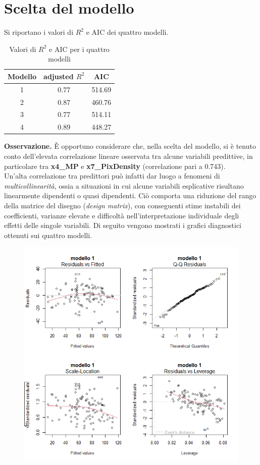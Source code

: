 \section{Scelta del modello}
Si riportano i valori di $R^2$ e AIC dei quattro modelli.
\begin{table}[H]
	\centering
	\begin{tabular}{|c|c|c|}
		\hline
		\textbf{Modello} & \textbf{adjusted} \boldmath$R^2$ & \textbf{AIC} \\
		\hline
		1 &  0.77  & 514.69 \\
		2 & 0.87 & 460.76 \\
		3 & 0.77 & 514.11 \\
		4 & 0.89 & 448.27 \\
		\hline
	\end{tabular}
	\caption{Valori di $R^2$ e AIC per i quattro modelli}
\end{table}
\textbf{Osservazione.} È opportuno considerare che, nella scelta del modello, si è tenuto conto dell’elevata correlazione lineare osservata tra alcune variabili predittive, in particolare tra \textbf{x4\_MP} e \textbf{x7\_PixDensity} (correlazione pari a 0.743). \\ 
   Un’alta correlazione tra predittori può infatti dar luogo a fenomeni di \emph{multicollinearità}, ossia a situazioni in cui alcune variabili esplicative risultano linearmente dipendenti o quasi dipendenti. Ciò comporta una riduzione del rango della matrice del disegno (\emph{design matrix}), con conseguenti stime instabili dei coefficienti, varianze elevate e difficoltà nell’interpretazione individuale degli effetti delle singole variabili.
Di seguito vengono mostrati i grafici diagnostici ottenuti sui quattro modelli.
\begin{figure}[H]
	\centering
	\includegraphics[width=0.95\linewidth]{../graphs/diagnostica/diagnostica_ridotto}
	\label{fig:diagnosticaridotto}
\end{figure}
